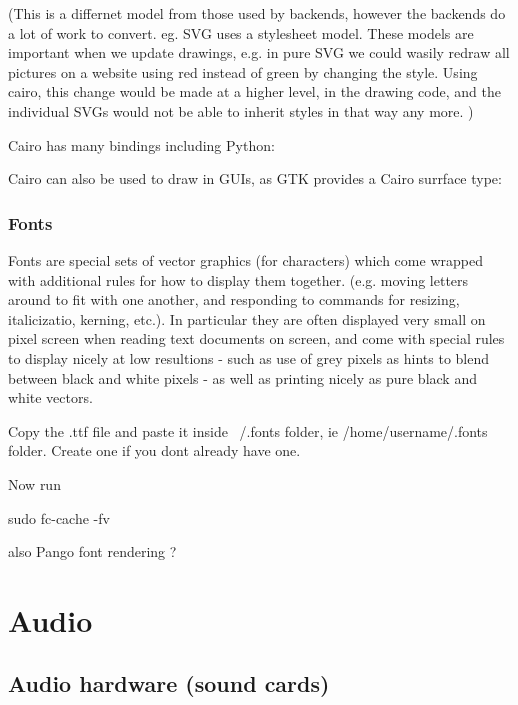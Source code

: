 \documentclass[oneside,english]{scrbook}
\begin{document}
(This is a differnet model from those used by backends, however the backends do a lot of work to convert. eg. SVG uses a stylesheet model.  These models are important when we update drawings, e.g. in pure SVG we could wasily redraw all pictures on a website using red instead of green by changing the style. Using cairo, this change would be made at a higher level, in the drawing code, and the individual SVGs would not be able to inherit styles in that way any more. )



Cairo has many bindings including Python:



Cairo can also be used to draw in GUIs, as GTK provides a Cairo surrface type:



\section{Fonts}

Fonts are special sets of vector graphics (for characters) which come wrapped with additional rules for how to display them together. (e.g. moving letters around to fit with one another, and responding to commands for resizing, italicizatio, kerning, etc.). In particular they are often displayed very small on pixel screen when reading text documents on screen, and come with special rules to display nicely at low resultions - such as use of grey pixels as hints to blend between black and white pixels - as well as printing nicely as pure black and white vectors.

Copy the .ttf file and paste it inside ~/.fonts folder, ie /home/username/.fonts folder. Create one if you dont already have one.

Now run

sudo fc-cache -fv


also Pango font rendering ?


\part{Audio}


\chapter{Audio hardware (sound cards)}
\end{document}
